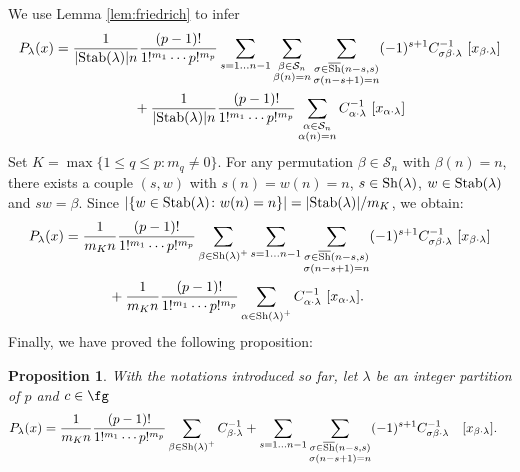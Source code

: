 \documentclass[12pt]{article}
\newtheorem{proposition}[theorem]{Proposition}
\begin{document}
We use Lemma \ref{lem:friedrich} to infer
\begin{align}
  P_{\lambda}(x)&= \frac{1}{|{\rm Stab}(\lambda)|n}\frac{(p-1)!}{1!^{m_1}\cdots  p!^{m_p}}\sum_{s=1\ldots n-1}\sum_{\substack{\beta\in \mathcal{S}_n \\ \beta(n)=n}}\sum_{\substack{\sigma \in \overline{{\rm Sh}}(n-s,s) \\\sigma(n-s+1)=n}} (-1)^{s+1} C^{-1}_{ \sigma\beta \cdot \lambda } \,\, [x_{\beta\cdot \lambda}] \\
  &\hspace{2cm} + \frac{1}{|{\rm Stab}(\lambda)|n}\frac{(p-1)!}{1!^{m_1}\cdots  p!^{m_p}} \sum_{\substack{\alpha \in \mathcal{S}_n \\ \alpha(n)=n}} C^{-1}_{\alpha\cdot\lambda} \,\,[x_{\alpha\cdot\lambda}]
  \end{align}
  Set $K = \max\{ 1 \leq q \leq p \colon m_q \neq 0\}$. For any  permutation $\beta \in \mathcal{S}_n$ with $\beta(n)=n$, there exists a couple $(s,w)$ with $s(n) = w(n)=n$, $s\in {\rm Sh}(\lambda)$, $w \in {\rm Stab}(\lambda)$ and $sw=\beta$. Since $|\{ w  \in {\rm Stab}(\lambda) \colon w(n)=n\}| = |{\rm Stab}(\lambda)|/m_K$, we obtain:
  \begin{align}
  &P_{\lambda}(x)= \frac{1}{m_Kn}\frac{(p-1)!}{1!^{m_1}\cdots  p!^{m_p}}\sum_{\substack{\beta\in {\rm Sh}(\lambda)^{+}}}\sum_{s=1\ldots n-1}\sum_{\substack{\sigma \in \overline{{\rm Sh}}(n-s,s) \\\sigma(n-s+1)=n}} (-1)^{s+1} C^{-1}_{ \sigma\beta \cdot \lambda } \,\, [x_{\beta\cdot \lambda}] \label{eqn:lastone}\\
  &\hspace{2cm} + \frac{1}{m_K n}\frac{(p-1)!}{1!^{m_1}\cdots  p!^{m_p}} \sum_{\substack{\alpha \in {\rm Sh}(\lambda)^{+}}} C^{-1}_{\alpha\cdot\lambda} \,\,[x_{\alpha\cdot\lambda}].\label{eqn:lastoneone}
\end{align}
Finally, we have proved the following proposition:
\begin{proposition} With the notations introduced so far, let $\lambda$ be an integer partition of $p$ and $c \in \fg$
\begin{align}
&P_{\lambda}(x)= \frac{1}{m_K n}\frac{(p-1)!}{1!^{m_1}\cdots  p!^{m_p}}\sum_{\substack{\beta\in {\rm Sh}(\lambda)^{+}}}C^{-1}_{\beta\cdot\lambda}+\sum_{s=1\ldots n-1}\sum_{\substack{\sigma \in \overline{{\rm Sh}}(n-s,s) \\\sigma(n-s+1)=n}} (-1)^{s+1} C^{-1}_{ \sigma\beta \cdot \lambda } \quad [x_{\beta\cdot \lambda}].
\end{align}
\end{proposition}
\end{document}
